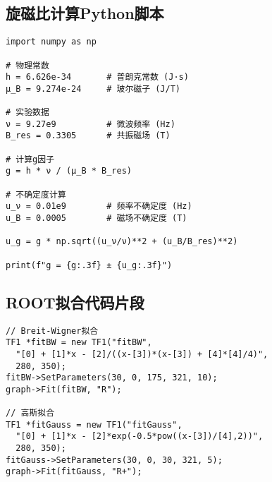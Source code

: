 \documentclass{thuemp}
\begin{document}
\subsection{旋磁比计算Python脚本}
\begin{verbatim}
import numpy as np

# 物理常数
h = 6.626e-34       # 普朗克常数 (J·s)
μ_B = 9.274e-24     # 玻尔磁子 (J/T)

# 实验数据
ν = 9.27e9          # 微波频率 (Hz)
B_res = 0.3305      # 共振磁场 (T)

# 计算g因子
g = h * ν / (μ_B * B_res)

# 不确定度计算
u_ν = 0.01e9        # 频率不确定度 (Hz)
u_B = 0.0005        # 磁场不确定度 (T)

u_g = g * np.sqrt((u_ν/ν)**2 + (u_B/B_res)**2)

print(f"g = {g:.3f} ± {u_g:.3f}")
\end{verbatim}

\subsection{ROOT拟合代码片段}
\begin{verbatim}
// Breit-Wigner拟合
TF1 *fitBW = new TF1("fitBW", 
  "[0] + [1]*x - [2]/((x-[3])*(x-[3]) + [4]*[4]/4)", 
  280, 350);
fitBW->SetParameters(30, 0, 175, 321, 10);
graph->Fit(fitBW, "R");

// 高斯拟合
TF1 *fitGauss = new TF1("fitGauss", 
  "[0] + [1]*x - [2]*exp(-0.5*pow((x-[3])/[4],2))", 
  280, 350);
fitGauss->SetParameters(30, 0, 30, 321, 5);
graph->Fit(fitGauss, "R+");
\end{verbatim}
\end{document}
